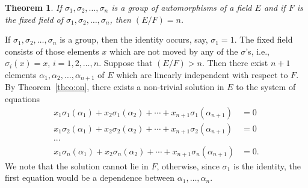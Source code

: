 \documentclass[10pt,leqno]{article}
\newtheorem{theo}{Theorem}
\theoremstyle{definition}
\begin{document}
\begin{theo}
\label{theo:onfo}
If $\sigma_1, \sigma_2, \ldots, \sigma_n$ is a group of automorphisms of a field $E$ and if $F$ is the fixed field of $\sigma_1, \sigma_2, \ldots, \sigma_n$, then $(E/F) = n$.
\end{theo}

If $\sigma_1, \sigma_2, \ldots, \sigma_n$ is a group, then the identity occurs, say, $\sigma_1 = 1$.
The fixed field consists of those elements $x$ which are not moved by any of the $\sigma$'s, i.e., $\sigma_i(x) = x$, $i = 1,2,\ldots,n$.
Suppose that $(E/F) > n$.
Then there exist $n+1$ elements $\alpha_1, \alpha_2, \ldots, \alpha_{n+1}$ of $E$ which are linearly independent with respect to $F$.
By Theorem~\ref{theo:on}, there exists a non-trivial solution in $E$ to the system of equations
\begin{equation}
\tag{'}
\begin{aligned}
x_1 \sigma_1(\alpha_1) + 
x_2 \sigma_1(\alpha_2) + 
\cdots +
x_{n+1} \sigma_{1}(\alpha_{n+1}) &= 0
\\
x_1 \sigma_2(\alpha_1) + 
x_2 \sigma_2(\alpha_2) + 
\cdots +
x_{n+1} \sigma_{2}(\alpha_{n+1}) &= 0
\\
\cdots &
\\
x_1 \sigma_{n}(\alpha_1) + 
x_2 \sigma_{n}(\alpha_2) + 
\cdots +
x_{n+1} \sigma_{n}(\alpha_{n+1}) &= 0.
\end{aligned}
\end{equation}
We note that the solution cannot lie in $F$, otherwise, since $\sigma_1$ is the identity, the first equation would be a dependence between $\alpha_1, \ldots, \alpha_n$.
\end{document}
